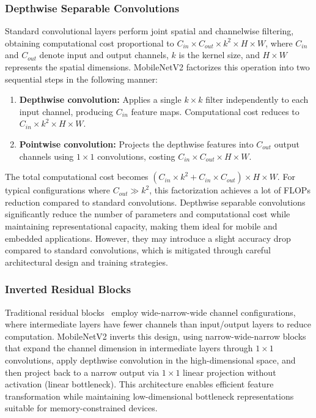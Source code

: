 \subsubsection*{Depthwise Separable Convolutions}

Standard convolutional layers perform joint spatial and channelwise filtering, obtaining computational cost proportional to $C_{in} \times C_{out} \times k^2 \times H \times W$, where $C_{in}$ and $C_{out}$ denote input and output channels, $k$ is the kernel size, and $H \times W$ represents the spatial dimensions. MobileNetV2 factorizes this operation into two sequential steps in the following manner:

\begin{enumerate}
    \item \textbf{Depthwise convolution:} Applies a single $k \times k$ filter independently to each input channel, producing $C_{in}$ feature maps. Computational cost reduces to $C_{in} \times k^2 \times H \times W$.
    \item \textbf{Pointwise convolution:} Projects the depthwise features into $C_{out}$ output channels using $1 \times 1$ convolutions, costing $C_{in} \times C_{out} \times H \times W$.
\end{enumerate}

The total computational cost becomes $(C_{in} \times k^2 + C_{in} \times C_{out}) \times H \times W$. For typical configurations where $C_{out} \gg k^2$, this factorization achieves a lot of FLOPs reduction compared to standard convolutions. Depthwise separable convolutions significantly reduce the number of parameters and computational cost while maintaining representational capacity, making them ideal for mobile and embedded applications. However, they may introduce a slight accuracy drop compared to standard convolutions, which is mitigated through careful architectural design and training strategies.

\subsubsection*{Inverted Residual Blocks}

Traditional residual blocks~\cite{he2016deep} employ wide-narrow-wide channel configurations, where intermediate layers have fewer channels than input/output layers to reduce computation. MobileNetV2 inverts this design, using narrow-wide-narrow blocks that expand the channel dimension in intermediate layers through $1 \times 1$ convolutions, apply depthwise convolution in the high-dimensional space, and then project back to a narrow output via $1 \times 1$ linear projection without activation (linear bottleneck). This architecture enables efficient feature transformation while maintaining low-dimensional bottleneck representations suitable for memory-constrained devices.

